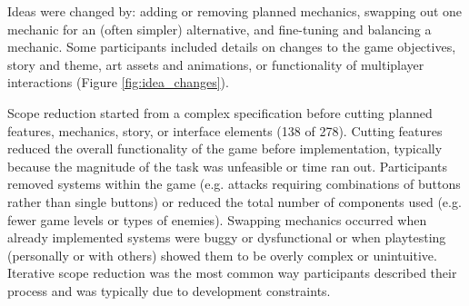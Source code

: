 \documentclass{sig-alternate}
\begin{document}

Ideas were changed by: adding or removing planned mechanics, swapping out one mechanic for an (often simpler) alternative, and fine-tuning and balancing a mechanic. Some participants included details on changes to the game objectives, story and theme, art assets and animations, or functionality of multiplayer interactions (Figure \ref{fig:idea_changes}).

Scope reduction started from a complex specification before cutting planned features, mechanics, story, or interface elements (138 of 278).
Cutting features reduced the overall functionality of the game before implementation, typically because the magnitude of the task was unfeasible or time ran out. Participants removed systems within the game (e.g. attacks requiring combinations of buttons rather than single buttons) or reduced the total number of components used (e.g. fewer game levels or types of enemies).
Swapping mechanics occurred when already implemented systems were buggy or dysfunctional or when playtesting (personally or with others) showed them to be overly complex or unintuitive. 
Iterative scope reduction was the most common way participants described their process and was typically due to development constraints.
\end{document}
